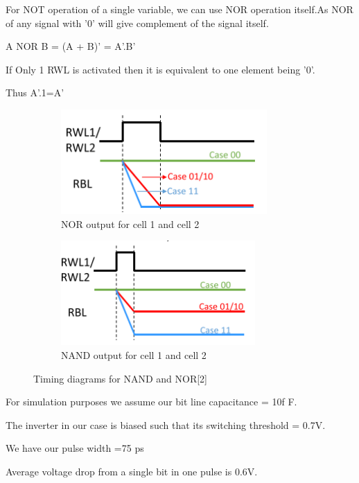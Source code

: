 For NOT operation of a single variable, we can use NOR operation itself.As NOR of any signal with '0' will give complement of the signal itself.

A NOR B = (A + B)' = A'.B'

If Only 1 RWL is activated then it is equivalent to one element being '0'. 

Thus A'.1=A' 

\begin{figure}[h]
 \centering
\begin{subfigure}{0.4\textwidth}
\includegraphics[width=\linewidth, height=4cm]{3.PNG} 
\caption{NOR output for cell 1 and cell 2}
\label{fig:subim1}
\end{subfigure}
\begin{subfigure}{0.4\textwidth}
\includegraphics[width=\linewidth, height=4cm]{4.PNG}
\caption{NAND output for cell 1 and cell 2}
\label{fig:subim2}
\end{subfigure}
 
\caption{Timing diagrams for NAND and NOR[2]}
\label{fig:image2}
\end{figure}


For simulation purposes we assume our bit line capacitance = 10f F. 

The inverter in our case is biased such that its switching threshold = 0.7V.

We have our pulse width =75 ps

Average voltage drop from a single bit in one pulse is 0.6V.


